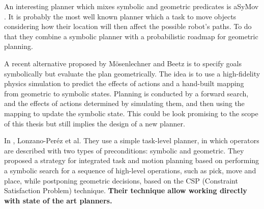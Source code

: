 An interesting planner which mixes symbolic and geometric predicates is
aSyMov \citep{aSyMov}. It is probably the most well known planner which a task to move objects considering how their location will then affect the possible robot's paths. To do that they combine a symbolic planner with a probabilistic roadmap \citep{Visility-based-PRM} for geometric planning. 

A recent alternative proposed by Mösenlechner and Beetz \citep{Msenlechner2009UsingPA}
is to specify goals symbolically but evaluate the plan geometrically.
The idea is to use a high-fidelity physics simulation to predict
the effects of actions and a hand-built mapping from geometric
to symbolic states. Planning is conducted by a forward search,
and the effects of actions determined by simulating them, and
then using the mapping to update the symbolic state. This could be look promising to the scope of this thesis but still implies the design of a new planner. 

In \citep{lozano2014constraint}, Lonzano-Peréz et al. They use a simple task-level planner, in which operators are described with two types of preconditions: symbolic and geometric. They proposed a strategy for integrated
task and motion planning based on performing a symbolic
search for a sequence of high-level operations, such as pick,
move and place, while postponing geometric decisions, based on the CSP (Constraint Satisfaction Problem) technique.
\textbf{Their technique allow working directly with state of the art planners.}


